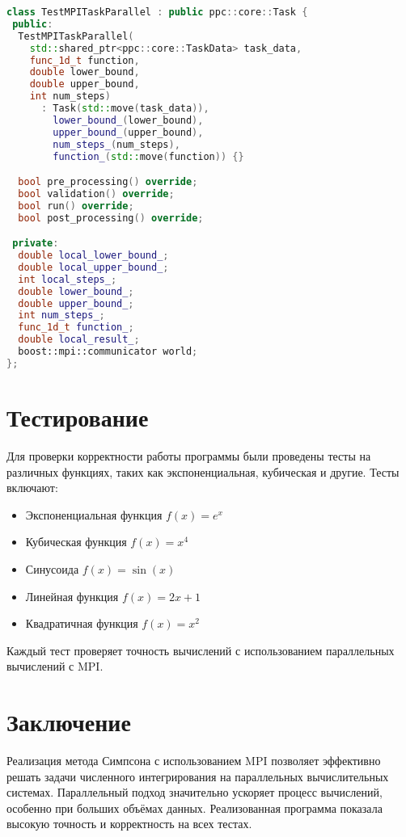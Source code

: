 \documentclass{article}
\begin{document}
\begin{lstlisting}[language=C++, frame=single, caption={Класс для параллельного выполнения задачи}, breaklines=true]
class TestMPITaskParallel : public ppc::core::Task {
 public:
  TestMPITaskParallel(
    std::shared_ptr<ppc::core::TaskData> task_data, 
    func_1d_t function, 
    double lower_bound, 
    double upper_bound, 
    int num_steps)
      : Task(std::move(task_data)),
        lower_bound_(lower_bound),
        upper_bound_(upper_bound),
        num_steps_(num_steps),
        function_(std::move(function)) {}

  bool pre_processing() override;
  bool validation() override;
  bool run() override;
  bool post_processing() override;

 private:
  double local_lower_bound_;
  double local_upper_bound_;
  int local_steps_;
  double lower_bound_;
  double upper_bound_;
  int num_steps_;
  func_1d_t function_;
  double local_result_;
  boost::mpi::communicator world;
};
\end{lstlisting}

\section{Тестирование}
Для проверки корректности работы программы были проведены тесты на различных функциях, таких как экспоненциальная, кубическая и другие. Тесты включают:

\begin{itemize}
    \item Экспоненциальная функция \( f(x) = e^x \)
    \item Кубическая функция \( f(x) = x^4 \)
    \item Синусоида \( f(x) = \sin(x) \)
    \item Линейная функция \( f(x) = 2x + 1 \)
    \item Квадратичная функция \( f(x) = x^2 \)
\end{itemize}

Каждый тест проверяет точность вычислений с использованием параллельных вычислений с MPI.

\section{Заключение}
Реализация метода Симпсона с использованием MPI позволяет эффективно решать задачи численного интегрирования на параллельных вычислительных системах. Параллельный подход значительно ускоряет процесс вычислений, особенно при больших объёмах данных. Реализованная программа показала высокую точность и корректность на всех тестах.
\end{document}
